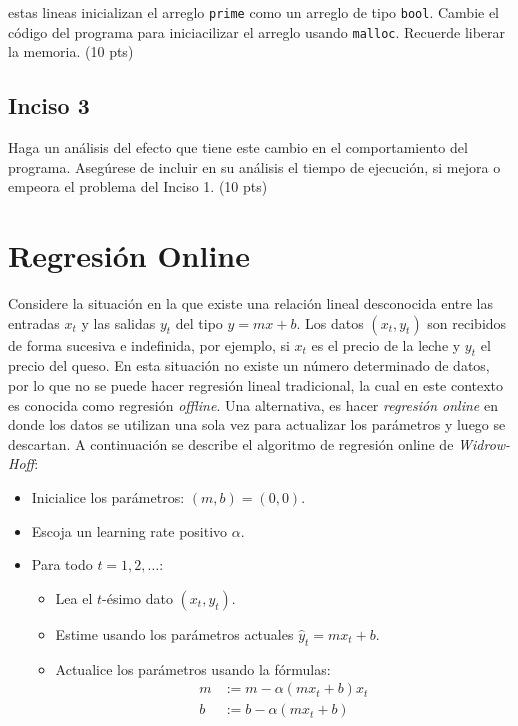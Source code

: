 \documentclass{article}
\begin{document}
estas lineas inicializan el arreglo \texttt{prime} como un arreglo de tipo \texttt{bool}. Cambie el código del programa para iniciacilizar el arreglo usando \texttt{malloc}. Recuerde liberar la memoria. (10 pts)

\subsection{Inciso 3}
Haga un análisis del efecto que tiene este cambio en el comportamiento del programa. Asegúrese de incluir en su análisis el tiempo de ejecución, si mejora o empeora el problema del Inciso 1. (10 pts)


\section{Regresión Online}
Considere la situación en la que existe una relación lineal desconocida entre las entradas $x_t$ y las salidas $y_t$ del tipo $y = m x + b$. Los datos $(x_t, y_t)$ son recibidos de forma sucesiva e indefinida, por ejemplo, si $x_t$ es el precio de la leche y $y_t$ el precio del queso. En esta situación no existe un número determinado de datos, por lo que no se puede hacer regresión lineal tradicional, la cual en este contexto es conocida como regresión \textit{offline}. Una alternativa, es hacer \emph{regresión online} en donde los datos se utilizan una sola vez para actualizar los parámetros y luego se descartan. A continuación se describe el algoritmo de regresión online de \emph{Widrow-Hoff}:
\begin{itemize}
    \item Inicialice los parámetros: $(m, b) = (0,0)$.
    \item Escoja un learning rate positivo $\alpha$.
    \item Para todo $t = 1, 2, \ldots$:
        \begin{itemize}
            \item Lea el $t$-ésimo dato $(x_t, y_t)$.
            \item Estime usando los parámetros actuales $\hat y_t = m x_t + b$.
            \item Actualice los parámetros usando la fórmulas:
                $$\begin{aligned}
                m &:= m -\alpha (mx_t + b)x_t\\
                b &:= b -\alpha (mx_t + b)
            \end{aligned}$$
        \end{itemize}
\end{itemize}
\end{document}
